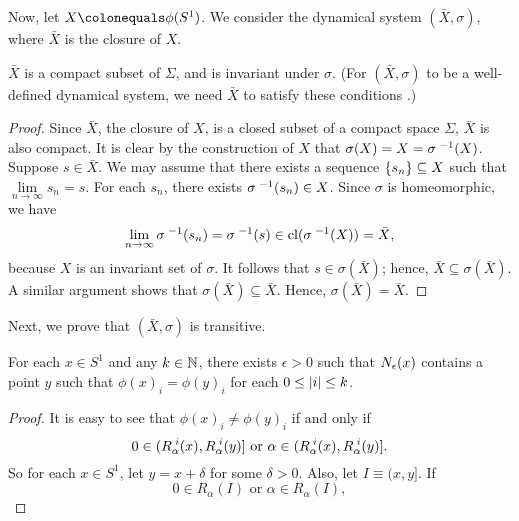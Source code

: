 \documentclass[10pt,twoside,draft]{book}
\begin{document}
\begin{example}
\begin{proposition}
  \end{proposition}
  Now, let $X \ceq \phi(S^1)$.
  We consider the dynamical system $(\bar{X}, \sigma)$, where $\bar{X}$ is the closure of $X$.
  \begin{proposition}
    $\bar{X}$ is a compact subset of $\Sigma$, and is invariant under $\sigma$.
    (For $(\bar{X}, \sigma)$ to be a well-defined dynamical system, we need $\bar{X}$ to satisfy these conditions \citep[p.179]{lind}.)
    \begin{proof}
      Since $\bar{X}$, the closure of $X$, is a closed subset of a compact space $\Sigma$, $\bar{X}$ is also compact.
      It is clear by the construction of $X$ that $\sigma(X) = X = \sigma^{\;-1}(X)$.
      Suppose $s \in \bar{X}$.
      We may assume that there exists a sequence $\left \{ s_n \right \} \subseteq X$ such that $\lim\limits_{n \to \infty} s_n = s$.
      For each $s_n$, there exists $\sigma^{\;-1}(s_n) \in X$.
      Since $\sigma$ is homeomorphic, we have 
      \begin{equation*}
        \lim\limits_{n \to \infty} \sigma^{\;-1}(s_n) 
        = \sigma^{\;-1}(s) 
        \in \mathrm{cl}(\sigma^{\;-1}(X)) 
        = \bar{X},
      \end{equation*}
      because $X$ is an invariant set of $\sigma$.
      It follows that $s \in \sigma(\bar{X})$; hence, $\bar{X} \subseteq \sigma(\bar{X})$.
      A similar argument shows that $\sigma(\bar{X}) \subseteq \bar{X}$.
      Hence, $\sigma(\bar{X}) = \bar{X}$.
    \end{proof}
  \end{proposition}
  Next, we prove that $(\bar{X}, \sigma)$ is transitive.
  \begin{lemma}
    For each $x \in S^1$ and any $k \in \mathbb{N}$, there exists $\epsilon > 0$ such that $N_{\epsilon}(x)$ contains a point $y$ such that 
    $\phi(x)_i = \phi(y)_i$ for each $0 \leq \left | i \right | \leq k$.
    \label{lem:sturmian2}
    \begin{proof}
      It is easy to see that $\phi(x)_i \neq \phi(y)_i$ if and only if
      \begin{equation*}
      0 \in (\itr{R_\alpha}{i}(x), \itr{R_\alpha}{i}(y)] \mbox{ or } \alpha \in (\itr{R_\alpha}{i}(x), \itr{R_\alpha}{i}(y)]. %
    \end{equation*}
    So for each $x \in S^1$, let $y = x + \delta$ for some $\delta > 0$.
  Also, let $I \equiv (x, y]$.
  If 
  \begin{equation*}
    0 \in R_\alpha(I) \mbox{ or } \alpha \in R_\alpha(I), 
  \end{equation*}

\end{proof}
\end{lemma}
\end{example}
\end{document}
